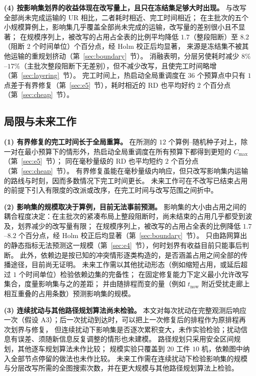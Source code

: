 \documentclass[manuscript,screen,review]{acmart}
\newcommand{\EfiveCells}{12}        %
\newcommand{\EfivePts}{36}          %
\newcommand{\ScaleJobsHi}{20}
\newcommand{\ScaleMachHi}{10}
\begin{document}
\textbf{(4) 按影响集划界的收益体现在改写量上，且只在冻结集足够大时出现。}
与改写全部尚未完成运输的 UR 相比，二者耗时相近、完工时间相近；
在主批次的五个小规模算例上，影响集几乎覆盖全部尚未完成的运输，改写量的差别很小且不显著；
在规模序列上，被改写的占用占全表的比例平均降低 \(1.7\)（整段阻断）至 \(8.2\)（阻断 \(2\) 个时间单位）个百分点，经 Holm 校正后均显著，
来源是冻结集不被其他运输的重规划挤动（第~\ref{sec:boundary}~节）。
消融表明，分层另使耗时减少 \(8\%\)--\(17\%\)（主批次整段阻断下无差别），但不减少改写，且使完工时间略增（第~\ref{sec:layering}~节）。
完工时间上，热启动全局重调度在 \(\EfivePts\) 个预算点中只有 \(1\) 点差于有界修复（第~\ref{sec:e5}~节），耗时相近的 RD 也平均好约 \(2\) 个百分点（第~\ref{sec:cheap}~节）。

\subsection{局限与未来工作}
\label{sec:limitations}

\textbf{(1) 有界修复的完工时间长于全局重算。}
在所测的 \(\EfiveCells\) 个算例--随机种子对上，除一对在最小预算下的情形外，热启动全局重调度在所有预算下都得到更短的 \(C_{\max}\)（第~\ref{sec:e5}~节）；
同在毫秒量级的 RD 也平均短约 \(2\) 个百分点（第~\ref{sec:cheap}~节）。
有界修复虽能在毫秒量级内响应，但只改写影响集内运输的路线与时刻，因而多数情况下完工时间更长。
未来工作可在不改写已结束占用的前提下引入有限度的改派或改序，在完工时间与改写范围之间折中。

\textbf{(2) 影响集的规模取决于算例，目前无法事前预测。}
影响集的大小由占用之间的耦合程度决定：在主批次的紧凑布局上整段阻断时，尚未结束的占用几乎都受到波及，划界减少的改写量有限；
在规模序列上，被改写的占用占全表的比例降低 \(1.7\)--\(8.2\) 个百分点，经 Holm 校正后均显著（第~\ref{sec:boundary}~节）。
只由路网算出的静态指标无法预测这一规模（第~\ref{sec:e4}~节），何时划界有收益目前只能事后判断。
此外，依赖边是按已知的冲突情形逐类构造的，是否涵盖占用之间全部的传播途径，目前尚无证明。
未来工作需以其他扰动形态（例如缩短占用，或延后超过 \(1\) 个时间单位）检验依赖边集的完备性；
在固定修复能力下定义最小允许改写集合，度量影响集与之的差距；
并由随排程而变的量（例如 \(t_{\mathrm{now}}\) 附近受扰走廊上相互重叠的占用条数）预测影响集的规模。

\textbf{(3) 连续扰动与其他路径规划算法尚未检验。}
本文对每次扰动在完整观测后响应一次（假设 A3）；后一次扰动到达时，可以把上一次修复后的排程作为原排程再次划界与修复，
但连续扰动下影响集是否逐次累积变大，未作实验检验；扰动信息有误差、须随新信息反复调整的情形也未建模。
路径规划只采用安全区间规划，其他逐车规划算法未作比较；
规模实验只覆盖到 \(\ScaleJobsHi\) 工件 \(\ScaleMachHi\) 机，依赖图中纳入全部节点停留的做法也未作比较。
未来工作需在连续扰动下检验影响集的规模与分层改写所需的全图搜索次数，并在更大规模与其他路径规划算法上检验。
\end{document}
